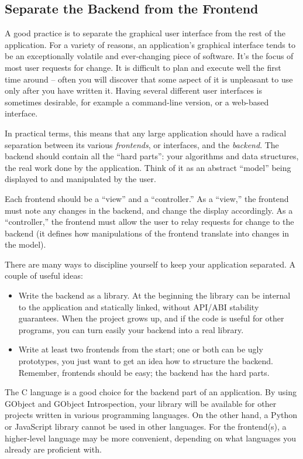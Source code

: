 \subsection{Separate the Backend from the Frontend}
A good practice is to separate the graphical user interface from the rest of the application. For a variety of reasons, an application's graphical interface tends to be an exceptionally volatile and ever-changing piece of software. It's the focus of most user requests for change. It is difficult to plan and execute well the first time around -- often you will discover that some aspect of it is unpleasant to use only after you have written it. Having several different user interfaces is sometimes desirable, for example a command-line version, or a web-based interface.

In practical terms, this means that any large application should have a radical separation between its various \emph{frontends}, or interfaces, and the \emph{backend}. The backend should contain all the ``hard parts'': your algorithms and data structures, the real work done by the application. Think of it as an abstract ``model'' being displayed to and manipulated by the user.

Each frontend should be a ``view'' and a ``controller.'' As a ``view,'' the frontend must note any changes in the backend, and change the display accordingly. As a ``controller,'' the frontend must allow the user to relay requests for change to the backend (it defines how manipulations of the frontend translate into changes in the model).

There are many ways to discipline yourself to keep your application separated. A couple of useful ideas:
\begin{itemize}
  \item Write the backend as a library. At the beginning the library can be internal to the application and statically linked, without API/ABI stability guarantees. When the project grows up, and if the code is useful for other programs, you can turn easily your backend into a real library.
  \item Write at least two frontends from the start; one or both can be ugly prototypes, you just want to get an idea how to structure the backend. Remember, frontends should be easy; the backend has the hard parts.
\end{itemize}

The C language is a good choice for the backend part of an application. By using GObject and GObject Introspection, your library will be available for other projects written in various programming languages. On the other hand, a Python or JavaScript library cannot be used in other languages. For the frontend(s), a higher-level language may be more convenient, depending on what languages you already are proficient with.

